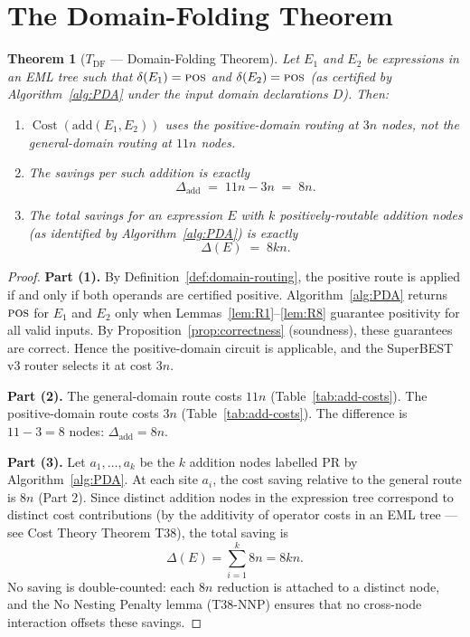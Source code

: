 \documentclass[12pt,a4paper]{article}
\newtheorem{theorem}{Theorem}[section]
\theoremstyle{definition}
\newcommand{\Cost}{\operatorname{Cost}}
\newcommand{\POS}{\textsc{pos}}
\begin{document}
\section{The Domain-Folding Theorem}
\label{sec:theorem}

\begin{theorem}[$T_{\mathrm{DF}}$ --- Domain-Folding Theorem]
\label{thm:TDF}
Let $E_1$ and $E_2$ be expressions in an EML tree such that
$\delta(E_1) = \POS$ and $\delta(E_2) = \POS$ (as certified by
Algorithm~\ref{alg:PDA} under the input domain declarations $D$).
Then:
\begin{enumerate}
  \item $\Cost(\mathrm{add}(E_1, E_2))$ uses the positive-domain routing at
        $3n$ nodes, not the general-domain routing at $11n$ nodes.
  \item The savings per such addition is exactly
        \[
          \Delta_{\mathrm{add}} \;=\; 11n - 3n \;=\; 8n.
        \]
  \item The total savings for an expression $E$ with $k$ positively-routable
        addition nodes (as identified by Algorithm~\ref{alg:PDA}) is exactly
        \[
          \Delta(E) \;=\; 8kn.
        \]
\end{enumerate}
\end{theorem}

\begin{proof}
\textbf{Part (1).}
By Definition~\ref{def:domain-routing}, the positive route is applied if and
only if both operands are certified positive.
Algorithm~\ref{alg:PDA} returns $\POS$ for $E_1$ and $E_2$ only when
Lemmas~\ref{lem:R1}--\ref{lem:R8} guarantee positivity for all valid inputs.
By Proposition~\ref{prop:correctness} (soundness), these guarantees are
correct.  Hence the positive-domain circuit is applicable, and the SuperBEST v3
router selects it at cost $3n$.

\textbf{Part (2).}
The general-domain route costs $11n$ (Table~\ref{tab:add-costs}).
The positive-domain route costs $3n$ (Table~\ref{tab:add-costs}).
The difference is $11 - 3 = 8$ nodes: $\Delta_{\mathrm{add}} = 8n$.

\textbf{Part (3).}
Let $a_1, \ldots, a_k$ be the $k$ addition nodes labelled $\mathrm{PR}$ by
Algorithm~\ref{alg:PDA}.  At each site $a_i$, the cost saving relative to the
general route is $8n$ (Part 2).  Since distinct addition nodes in the expression
tree correspond to distinct cost contributions (by the additivity of operator
costs in an EML tree --- see Cost Theory Theorem T38), the total saving is
\[
  \Delta(E) = \sum_{i=1}^{k} 8n = 8kn.
\]
No saving is double-counted: each $8n$ reduction is attached to a distinct node,
and the No Nesting Penalty lemma (T38-NNP) ensures that no cross-node
interaction offsets these savings.
\end{proof}
\end{document}
